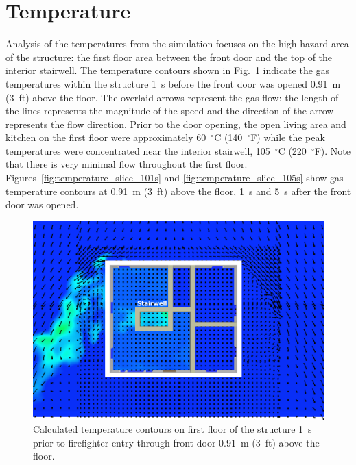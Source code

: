 \documentclass[12pt,oneside]{book}
\begin{document}
\clearpage

\section{Temperature}
\label{temp}

Analysis of the temperatures from the simulation focuses on the high-hazard area of the structure: the first floor area between the front door and the top of the interior stairwell. The temperature contours shown in Fig.~\ref{fig:temperature_slice_99s} indicate the gas temperatures within the structure 1~s before the front door was opened 0.91~m (3~ft) above the floor. The overlaid arrows represent the gas flow: the length of the lines represents the magnitude of the speed and the direction of the arrow represents the flow direction. Prior to the door opening, the open living area and kitchen on the first floor were approximately 60~$^{\circ}$C (140~$^{\circ}$F) while the peak temperatures were concentrated near the interior stairwell, 105~$^{\circ}$C (220~$^{\circ}$F). Note that there is very minimal flow throughout the first floor. Figures~\ref{fig:temperature_slice_101s} and \ref{fig:temperature_slice_105s} show gas temperature contours at 0.91~m (3~ft) above the floor, 1~s and 5~s after the front door was opened.

\begin{figure}[!ht]
\includegraphics[trim = 1in 1in 1in 1in, clip=true, width=.65\textwidth]{../Figures/temperature_slice_99s}


\caption[Calculated temperature on first floor 1~s before front door opened]
{Calculated temperature contours on first floor of the structure 1~s prior to firefighter entry through front door 0.91~m (3~ft) above the floor.}
\label{fig:temperature_slice_99s}
\end{figure}
\end{document}
